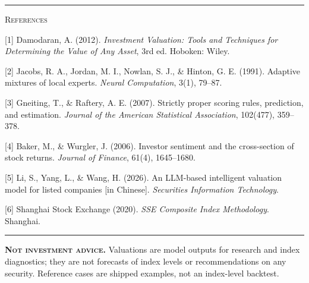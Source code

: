 \documentclass[10pt]{article}
\newcommand{\notefont}{\fontsize{16.5}{20}\selectfont}
\begin{document}
\vfill
\noindent\hspace*{24mm}%
\begin{minipage}{793mm}
{\color{gold}\rule{\linewidth}{0.5pt}}\par
\vspace{2.6mm}
{\fontsize{20}{24}\selectfont\color{burgundy}\scshape{}References}\par
\vspace{2.2mm}
\begin{minipage}[t]{385.5mm}\RaggedRight
{\fontsize{18}{22}\selectfont\color{ink}
[1] Damodaran, A. (2012). \textit{Investment Valuation: Tools and Techniques
for Determining the Value of Any Asset}, 3rd ed. Hoboken: Wiley.\par
\vspace{1.2mm}
[2] Jacobs, R. A., Jordan, M. I., Nowlan, S. J., \& Hinton, G. E. (1991).
Adaptive mixtures of local experts. \textit{Neural Computation}, 3(1), 79--87.\par
\vspace{1.2mm}
[3] Gneiting, T., \& Raftery, A. E. (2007). Strictly proper scoring rules,
prediction, and estimation. \textit{Journal of the American Statistical
Association}, 102(477), 359--378.\par
}
\end{minipage}%
\hfill
\begin{minipage}[t]{385.5mm}\RaggedRight
{\fontsize{18}{22}\selectfont\color{ink}
[4] Baker, M., \& Wurgler, J. (2006). Investor sentiment and the cross-section
of stock returns. \textit{Journal of Finance}, 61(4), 1645--1680.\par
\vspace{1.2mm}
[5] Li, S., Yang, L., \& Wang, H. (2026). An LLM-based intelligent valuation
model for listed companies [in Chinese]. \textit{Securities Information
Technology}.\par
\vspace{1.2mm}
[6] Shanghai Stock Exchange (2020). \textit{SSE Composite Index Methodology}.
Shanghai.\par
}
\end{minipage}

\vspace{3.2mm}
{\color{gold}\rule{\linewidth}{0.4pt}}\par
\vspace{1.8mm}
{\notefont\color{stone}%
\textbf{\textsc{Not investment advice.}} Valuations are model outputs for
research and index diagnostics; they are not forecasts of index levels or
recommendations on any security. Reference cases are shipped examples, not an
index-level backtest.}\par
\end{minipage}
\par\vspace*{10mm}
\end{document}
